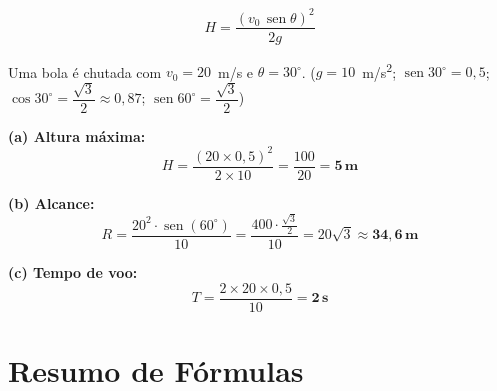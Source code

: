 \documentclass[12pt,a4paper]{article}
\begin{document}
\begin{tcolorbox}[formulabox={Altura M\'axima}]
  \[
    \boxed{H = \frac{(v_0\,\operatorname{sen}\theta)^2}{2g}}
  \]
\end{tcolorbox}

\begin{tcolorbox}[exemplobox={Exemplo 7 --- Lan\c{c}amento obl\'iquo}]
  Uma bola \'e chutada com $v_0 = 20$~m/s e $\theta = 30^\circ$.
  ($g = 10$~m/s\textsuperscript{2};\;
   $\operatorname{sen}30^\circ = 0{,}5$;\;
   $\cos 30^\circ = \dfrac{\sqrt{3}}{2} \approx 0{,}87$;\;
   $\operatorname{sen}60^\circ = \dfrac{\sqrt{3}}{2}$)

  \medskip
  \textbf{(a) Altura m\'axima:}
  \[
    H = \frac{(20\times 0{,}5)^2}{2 \times 10}
      = \frac{100}{20} = \mathbf{5\,\text{m}}
  \]

  \textbf{(b) Alcance:}
  \[
    R = \frac{20^2 \cdot \operatorname{sen}(60^\circ)}{10}
      = \frac{400\cdot\frac{\sqrt{3}}{2}}{10}
      = 20\sqrt{3} \approx \mathbf{34{,}6\,\text{m}}
  \]

  \textbf{(c) Tempo de voo:}
  \[
    T = \frac{2 \times 20 \times 0{,}5}{10} = \mathbf{2\,\text{s}}
  \]
\end{tcolorbox}


\section{Resumo de F\'ormulas}
\end{document}

